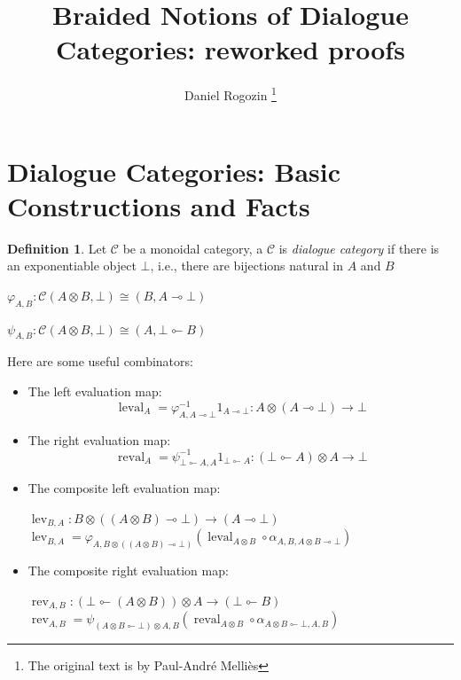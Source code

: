 \documentclass[8pt]{article}
\title{Braided Notions of Dialogue Categories: reworked proofs}
\author{Daniel Rogozin \footnote{The original text is by Paul-Andr\'{e} Melliès}}
\date{ }
\theoremstyle{definition}
\newtheorem{definition}{Definition}[section]
\theoremstyle{definition}
\theoremstyle{definition}
\theoremstyle{definition}
\theoremstyle{definition}
\theoremstyle{definition}
\theoremstyle{definition}
\theoremstyle{definition}
\theoremstyle{definition}
\theoremstyle{definition}
\theoremstyle{definition}
\theoremstyle{definition}
\theoremstyle{definition}
\theoremstyle{definition}
\theoremstyle{question}
\begin{document}
\maketitle

\section{Dialogue Categories: Basic Constructions and Facts}

\begin{definition}
  Let $\mathcal{C}$ be a monoidal category, a $\mathcal{C}$ is \emph{dialogue category}
  if there is an exponentiable object $\bot$, i.e., there are bijections natural in $A$ and $B$
  \begin{center}
    $\varphi_{A,B} : \mathcal{C}(A \otimes B, \bot) \cong (B, A \multimap \bot)$

    $\psi_{A, B} : \mathcal{C}(A \otimes B, \bot) \cong (A, \bot \multimapinv B )$
  \end{center}
\end{definition}

Here are some useful combinators:
\begin{itemize}
  \item The left evaluation map:
  \[
  \operatorname{leval}_A = \varphi^{-1}_{A,A \multimap \bot} 1_{A \multimap \bot} : A \otimes (A \multimap \bot) \to \bot
  \]
  \item The right evaluation map:
  \[
  \operatorname{reval}_A = \psi^{-1}_{\bot \multimapinv A, A} 1_{\bot \multimapinv A} : (\bot \multimapinv A) \otimes A \to \bot
  \]
  \item The composite left evaluation map:
  \begin{center}
  $ \operatorname{lev}_{B,A} : B \otimes ((A \otimes B) \multimap \bot) \to (A \multimap \bot)$ \\
  $\operatorname{lev}_{B,A} = \varphi_{A, B \otimes ((A \otimes B) \multimap \bot)} (\operatorname{leval}_{A \otimes B} \circ \alpha_{A, B, A \otimes B \multimap \bot})$
  \end{center}
  \item The composite right evaluation map:
  \begin{center}
  $\operatorname{rev}_{A, B} : (\bot \multimapinv (A \otimes B)) \otimes A \to (\bot \multimapinv B)$ \\
  $\operatorname{rev}_{A, B} = \psi_{(A \otimes B \multimapinv \bot) \otimes A, B} (\operatorname{reval}_{A \otimes B} \circ \alpha_{A \otimes B \multimapinv \bot, A, B} )$
  \end{center}
\end{itemize}
\end{document}
